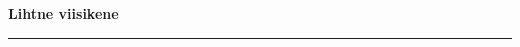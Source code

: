 \documentclass[10pt]{book}
\begin{document}
{
  \samepage
  \raggedbottom
  \raggedright
  \sloppy


  \vspace{0.2in}

  \noindent\begin{minipage}{.1\textwidth}
    \hfill\vspace{0.1in}
  \end{minipage}%
  \noindent\begin{minipage}{.8\textwidth}
    \centering
    \bfseries
    \large Lihtne viisikene
  \end{minipage}%
  \noindent\begin{minipage}{.1\textwidth}
      \hfill\vspace{0.1in}
  \end{minipage}

  \nopagebreak[4]
  \vspace{0.1in}
  \nopagebreak[4]
  \hrule height 0.05ex
  \nopagebreak[4]
  \vspace{-0.05in}




}
\end{document}
